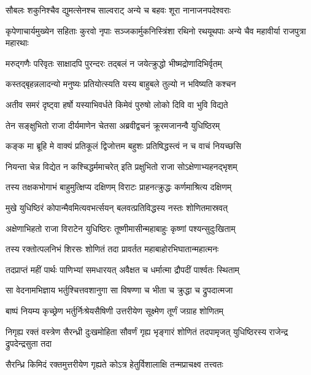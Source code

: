 \twolineshloka
{सौबलः शकुनिश्चैव द्युमत्सेनश्च साल्वराट्}
{अन्ये च बहवः शूरा नानाजनपदेश्वराः}


\threelineshloka
{कृपेणाचार्यमुख्येन सहिताः कुरवो नृपाः}
{सञ्जकार्मुकनिस्त्रिंशा रथिनो रथयूथपाः}
{अन्ये चैव महावीर्या राजपुत्रा महारथाः}


\twolineshloka
{मरुद्गणैः परिवृतः साक्षादपि पुरन्दरः}
{तद्बलं न जयेत्क्रुद्धो भीष्मद्रोणादिभिर्वृतम्}


\twolineshloka
{कस्तद्बृहन्नलादन्यो मनुष्यः प्रतियोत्स्यति}
{यस्य बाहुबले तुल्यो न भविष्यति कश्चन}


\twolineshloka
{अतीव समरं दृष्ट्वा हर्षो यस्याभिवर्धते}
{किमेवं पुरुषो लोको दिवि वा भुवि विद्यते}



\twolineshloka
{तेन सङ्क्षुभितो राजा दीर्यमाणेन चेतसा}
{अब्रवीद्वचनं क्रूरमजानन्वै युधिष्ठिरम्}


\twolineshloka
{कङ्क मा ब्रूहि मे वाक्यं प्रतिकूलं द्विजोत्तम}
{बहुशः प्रतिषिद्धस्त्वं न च वाचं नियच्छसि}


\twolineshloka
{नियन्ता चेन्न विद्येत न कश्चिद्धर्ममाचरेत्}
{इति प्रक्षुभितो राजा सोऽक्षेणाभ्यहनद्भृशम्}


\twolineshloka
{तस्य तक्षकभोगाभं बाहुमुत्क्षिप्य दक्षिणम्}
{विराटः प्राहनत्क्रुद्धः कर्णमाश्रित्य दक्षिणम्}


\twolineshloka
{मुखे युधिष्ठिरं कोपान्मैवमित्यवभर्त्सयन्}
{बलवत्प्रतिविद्धस्य नस्तः शोणितमास्रवत्}


\twolineshloka
{अक्षेणाभिहतो राजा विराटेन युधिष्ठिरः}
{तूष्णीमासीन्महाबाहुः कृष्णां पश्यन्सुदुःखिताम्}


\twolineshloka
{तस्य रक्तोत्पलनिभं शिरसः शोणितं तदा}
{प्रावर्तत महाबाहोरभिघातान्महात्मनः}


\twolineshloka
{तदप्राप्तं महीं पार्थः पाणिभ्यां समधारयत्}
{अवैक्षत च धर्मात्मा द्रौपदीं पार्श्वतः स्थिताम्}


\twolineshloka
{सा वेदनामभिज्ञाय भर्तुश्चित्तवशानुगा}
{सा विषण्णा च भीता च क्रुद्धा च द्रुपदात्मजा}


\twolineshloka
{बाष्पं नियम्य कृच्छ्रेण भर्तुर्निःश्रेयसैषिणी}
{उत्तरीयेण सूक्ष्मेण तूर्णं जग्राह शोणितम्}


\threelineshloka
{निगृह्य रक्तं वस्त्रेण सैरन्ध्री दुःखमोहिता}
{सौवर्णं गृह्य भृङ्गारं शोणितं तदपामृजत्}
{युधिष्ठिरस्य राजेन्द्र द्रुपदेन्द्रसुता तदा}




\twolineshloka
{सैरन्ध्रि किमिदं रक्तमुत्तरीयेण गृह्यते}
{कोऽत्र हेतुर्विशालाक्षि तन्मप्राचक्ष्व तत्त्वतः}

